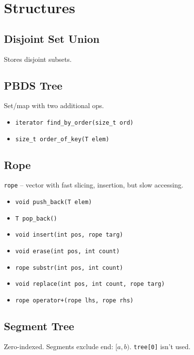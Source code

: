 \section{Structures}

\subsection{Disjoint Set Union}
Stores disjoint subsets.

\subsection{PBDS Tree}
Set/map with two additional ops.

\begin{itemize}
  \item \verb|iterator find_by_order(size_t ord)|
  \item \verb|size_t order_of_key(T elem)|
\end{itemize}

\subsection{Rope}
\verb|rope| -- vector with fast slicing, insertion, but slow accessing.

\begin{itemize}
  \item \verb|void push_back(T elem)|
  \item \verb|T pop_back()|
  \item \verb|void insert(int pos, rope targ)|
  \item \verb|void erase(int pos, int count)|
  \item \verb|rope substr(int pos, int count)|
  \item \verb|void replace(int pos, int count, rope targ)|
  \item \verb|rope operator+(rope lhs, rope rhs)|
\end{itemize}

\subsection{Segment Tree}

Zero-indexed. Segments exclude end: $[a, b)$. \verb|tree[0]| isn't used.

